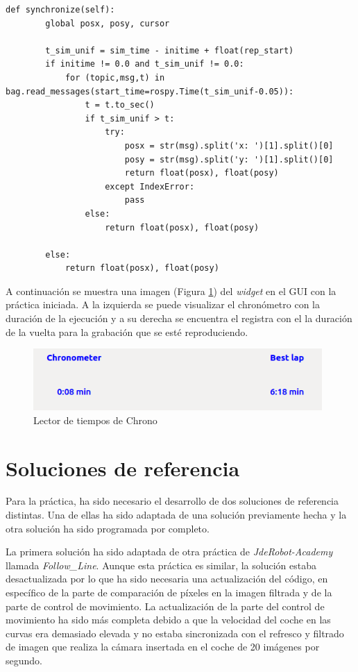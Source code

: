 \lstset{language=Python, breaklines=true, basicstyle=\footnotesize}
\begin{lstlisting}[frame=single]
def synchronize(self):
        global posx, posy, cursor

        t_sim_unif = sim_time - initime + float(rep_start)
        if initime != 0.0 and t_sim_unif != 0.0:
            for (topic,msg,t) in bag.read_messages(start_time=rospy.Time(t_sim_unif-0.05)):
                t = t.to_sec()
                if t_sim_unif > t:
                    try:
                        posx = str(msg).split('x: ')[1].split()[0]
                        posy = str(msg).split('y: ')[1].split()[0]
                        return float(posx), float(posy)
                    except IndexError:
                        pass
                else:
                    return float(posx), float(posy)

        else:
            return float(posx), float(posy)
\end{lstlisting}

A continuación se muestra una imagen (Figura \ref{fig.ltch}) del \textit{widget} en el GUI con la práctica iniciada. A la izquierda se puede visualizar el chronómetro con la duración de la ejecución y a su derecha se encuentra el registra con el la duración de la vuelta para la grabación que se esté reproduciendo.

\begin{figure}[H]
  \begin{center}
    \includegraphics[width=0.98\textwidth]{figures/lector_tiempos_chrono.png}
		\caption{Lector de tiempos de Chrono}
		\label{fig.ltch}
		\end{center}
\end{figure}

\section{Soluciones de referencia}
Para la práctica, ha sido necesario el desarrollo de dos soluciones de referencia distintas. Una de ellas ha sido adaptada de una solución previamente hecha y la otra solución ha sido programada por completo.

La primera solución ha sido adaptada de otra práctica de \textit{JdeRobot-Academy} llamada \textit{Follow_Line}. Aunque esta práctica es similar, la solución estaba desactualizada por lo que ha sido necesaria una actualización del código, en específico de la parte de comparación de píxeles en la imagen filtrada y de la parte de control de movimiento. La actualización de la parte del control de movimiento ha sido más completa debido a que la velocidad del coche en las curvas era demasiado elevada y no estaba sincronizada con el refresco y filtrado de imagen que realiza la cámara insertada en el coche de 20 imágenes por segundo.

